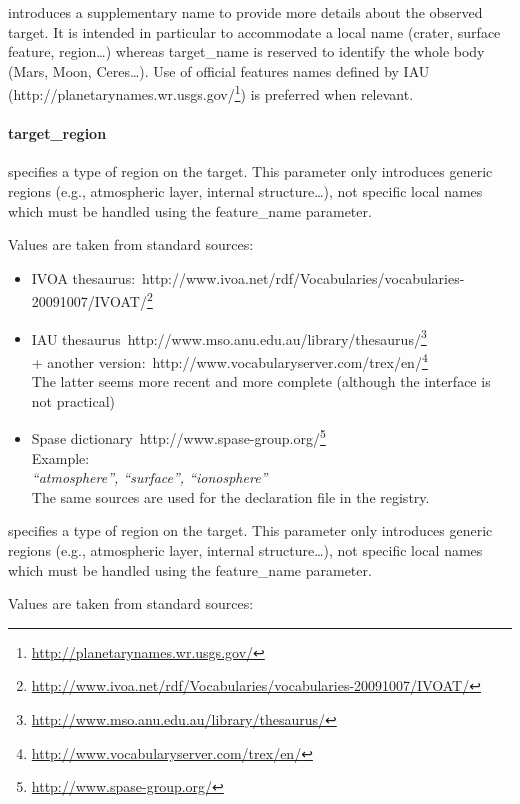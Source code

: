 \documentclass[11pt,a4paper]{ivoa}
\begin{document}
introduces a supplementary name to provide more details about the observed target. It is intended in particular to accommodate a local name (crater, surface feature, region…) whereas target\_name is reserved to identify the whole body (Mars, Moon, Ceres…). Use of official features names defined by IAU (http://planetarynames.wr.usgs.gov/\footnote{\url{http://planetarynames.wr.usgs.gov/}}) is preferred when relevant.

\paragraph{target\_region}

specifies a type of region on the target. This parameter only introduces generic regions  (e.g., atmospheric layer, internal structure…), not specific local names which must be handled using the feature\_name parameter.

Values are taken from standard sources:

\begin{itemize}
\item IVOA thesaurus: http://www.ivoa.net/rdf/Vocabularies/vocabularies-20091007/IVOAT/\footnote{\url{http://www.ivoa.net/rdf/Vocabularies/vocabularies-20091007/IVOAT/}}
\item IAU thesaurus http://www.mso.anu.edu.au/library/thesaurus/\footnote{\url{http://www.mso.anu.edu.au/library/thesaurus/}}\\+ another version: http://www.vocabularyserver.com/trex/en/\footnote{\url{http://www.vocabularyserver.com/trex/en/}}\\The latter seems more recent and more complete (although the interface is not practical)
\item Spase dictionary http://www.spase-group.org/\footnote{\url{http://www.spase-group.org/}}\\Example: \\\emph{``atmosphere'', ``surface'', ``ionosphere''}\\The same sources are used for the declaration file in the registry.
\end{itemize}

specifies a type of region on the target. This parameter only introduces generic regions  (e.g., atmospheric layer, internal structure…), not specific local names which must be handled using the feature\_name parameter.

Values are taken from standard sources:
\end{document}
